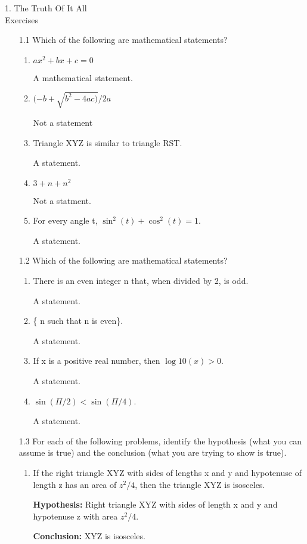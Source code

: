 \documentclass[11pt]{article}
\begin{document}
 1. The Truth Of It All\\
 Exercises
 \begin{enumerate}
   \item[1.1] Which of the following are mathematical statements?
   \begin{enumerate}
      \item $ax^2+bx+c=0$\par
      A mathematical statement.
      \item $(-b+\sqrt{b^2-4ac)}/2a$\par
      Not a statement
      \item Triangle XYZ is similar to triangle RST.\par
      A statement.
      \item $3+n+n^2$\par
      Not a statment.
      \item For every angle t, $\sin^2(t) + \cos^2(t) = 1$.\par
      A statement.
   \end{enumerate}
   \item[1.2] Which of the following are mathematical statements?
   \begin{enumerate}
     \item There is an even integer n that, when divided by 2, is odd.\par
     A statement.
     \item \{ n such that n is even\}.\par
     A statement.
     \item If x is a positive real number, then $\log10 (x) > 0$.\par
     A statement.
     \item $\sin(\Pi/2) < \sin(\Pi/4)$.\par
     A statement.
   \end{enumerate}
   \item[1.3] For each of the following problems, identify the hypothesis (what you can assume is true) and the conclusion (what you are trying to show is true).
   \begin{enumerate}
     \item If the right triangle XYZ with sides of lengths x and y and hypotenuse
of length z has an area of $z^2/4$, then the triangle XYZ is isosceles.\par
\textbf{Hypothesis:} Right triangle XYZ with sides of length x and y and hypotenuse z with area $z^2/4$.\par
\textbf{Conclusion:} XYZ is isosceles.

\end{enumerate}
\end{enumerate}
\end{document}
